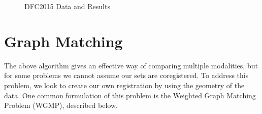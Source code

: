 \documentclass[journal]{IEEEtran}
\begin{document}
\begin{figure}
{    \label{fig:DFCevec02}%
  }%
  \hfill %
  \hfill {}%
  \caption{DFC2015 Data and Results}
  \label{fig:DFC}
\end{figure}
\section{Graph Matching}
\label{sec:GraphMatch}
The above algorithm gives an effective way of comparing multiple modalities, but
for some problems we cannot assume our sets are coregistered. To address this
problem, we look to create our own registration by using the geometry of the
data. One common formulation of this problem is the Weighted Graph Matching
Problem (WGMP), described below.
\end{document}
